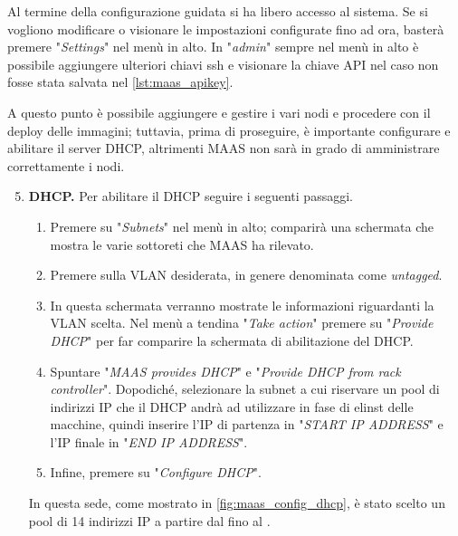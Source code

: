 \bigskip{}\label{sec:other_conf}\noindent
Al termine della configurazione guidata si ha libero accesso al sistema.
% 
Se si vogliono modificare o visionare le impostazioni configurate fino ad ora, basterà premere "\emph{Settings}" nel menù in alto.
% 
In "\emph{admin}" sempre nel menù in alto è possibile aggiungere ulteriori chiavi ssh e visionare la chiave API nel caso non fosse stata salvata nel \cref{lst:maas_apikey}.

\bigskip
A questo punto è possibile aggiungere e gestire i vari nodi e procedere con il deploy delle immagini; tuttavia, prima di proseguire, è importante  configurare e abilitare il server DHCP, altrimenti MAAS non sarà in grado di amministrare correttamente i nodi.
% 
\begin{enumerate}\setcounter{enumi}{4}
    \item \textbf{DHCP.} Per abilitare il DHCP seguire i seguenti passaggi.
    \begin{enumerate}
        \item Premere su "\emph{Subnets}" nel menù in alto; comparirà una schermata che mostra le varie sottoreti che MAAS ha rilevato.
 
        \item Premere sulla VLAN desiderata, in genere denominata come \emph{untagged}.

        \item In questa schermata verranno mostrate le informazioni riguardanti la VLAN scelta.
        Nel menù a tendina "\emph{Take action}" premere su "\emph{Provide DHCP}" per far comparire la schermata di abilitazione del DHCP.

        \item Spuntare "\emph{MAAS provides DHCP}" e "\emph{Provide DHCP from rack controller}".
        Dopodiché, selezionare la subnet a cui riservare un pool di indirizzi IP che il DHCP andrà ad utilizzare in fase di elinst delle macchine, quindi inserire l'IP di partenza in "\emph{START IP ADDRESS}" e l'IP finale in "\emph{END IP ADDRESS}".

        \item Infine, premere su "\emph{Configure DHCP}".
    \end{enumerate}
        In questa sede, come mostrato in \cref{fig:maas_config_dhcp}, è stato scelto un pool di 14 indirizzi IP a partire dal  fino al .
\end{enumerate}
